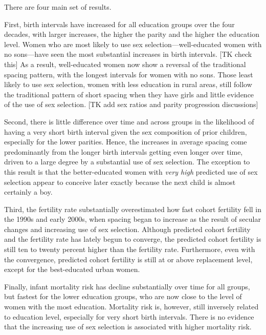 \documentclass[12pt,letterpaper]{article}
\begin{document}
 

There are four main set of results.

First, birth intervals have increased for all education groups over the four decades, 
with larger increases, the higher the parity and the higher the education level.
Women who are most likely to use sex selection---well-educated women with no
sons---have seen the most substantial increases in birth intervals.
[TK check this] As a result, well-educated women now show a reversal of the traditional spacing 
pattern, with the longest intervals for women with no sons.
Those least likely to use sex selection, women with less education in rural areas, 
still follow the traditional pattern of short spacing when they have girls and 
little evidence of the use of sex selection.
[TK add sex ratios and parity progression discussions]


Second, there is little difference over time and across groups in the likelihood of 
having a very short birth interval given the sex composition of prior children, 
especially for the lower parities.
Hence, the increases in average spacing come predominantly from the longer birth intervals
getting even longer over time, driven to a large degree by a substantial use of sex 
selection.
The exception to this result is that the better-educated women with \emph{very high} 
predicted use of sex selection appear to conceive later exactly because the next child is 
almost certainly a boy.

Third, the fertility rate substantially overestimated how fast cohort fertility fell 
in the 1990s and early 2000s, when spacing began to increase as the result of secular 
changes and increasing use of sex selection.
Although predicted cohort fertility and the fertility rate has lately begun to converge,
the predicted cohort fertility is still ten to twenty percent higher than the
fertility rate.
Furthermore, even with the convergence, predicted cohort fertility is still at or above 
replacement level, except for the best-educated urban women.

Finally, infant mortality risk has decline substantially over time for all groups,
but fastest for the lower education groups, who are now close to the level of women with 
the most education.
Mortality risk is, however, still inversely related to education level, especially for 
very short birth intervals.
There is no evidence that the increasing use of sex selection is associated with higher 
mortality risk.
\end{document}
